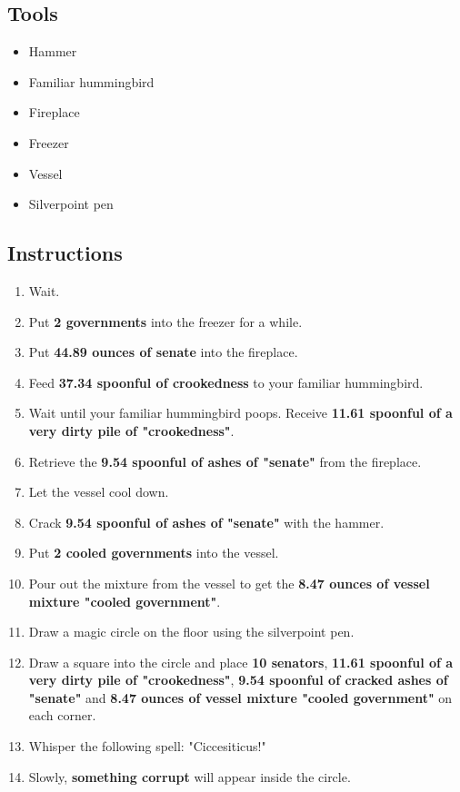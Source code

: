 \documentclass{article}
\begin{document}
\subsection{Tools}\begin{itemize}
\item 
Hammer
\item 
Familiar hummingbird
\item 
Fireplace
\item 
Freezer
\item 
Vessel
\item 
Silverpoint pen
\end{itemize}
\subsection{Instructions}\begin{enumerate}
\item 
Wait.
\item 
Put \textbf{2 governments} into the freezer for a while.
\item 
Put \textbf{44.89 ounces of senate} into the fireplace.
\item 
Feed \textbf{37.34 spoonful of crookedness} to your familiar hummingbird.
\item 
Wait until your familiar hummingbird poops. Receive \textbf{11.61 spoonful of a very dirty pile of "crookedness"}.
\item 
Retrieve the \textbf{9.54 spoonful of ashes of "senate"} from the fireplace.
\item 
Let the vessel cool down.
\item 
Crack \textbf{9.54 spoonful of ashes of "senate"} with the hammer.
\item 
Put \textbf{2 cooled governments} into the vessel.
\item 
Pour out the mixture from the vessel to get the \textbf{8.47 ounces of vessel mixture "cooled government"}.
\item 
Draw a magic circle on the floor using the silverpoint pen.
\item 
Draw a square into the circle and place \textbf{10 senators}, \textbf{11.61 spoonful of a very dirty pile of "crookedness"}, \textbf{9.54 spoonful of cracked ashes of "senate"} and \textbf{8.47 ounces of vessel mixture "cooled government"} on each corner.
\item 
Whisper the following spell: "Ciccesiticus!"
\item 
Slowly, \textbf{something corrupt} will appear inside the circle.
\end{enumerate}
\newpage
\end{document}

